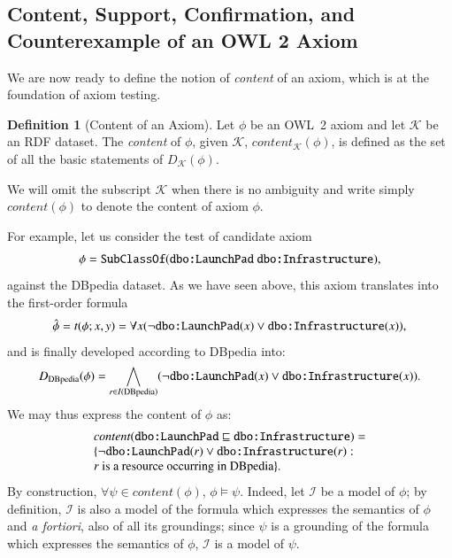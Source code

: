 \documentclass[review]{elsarticle}
\theoremstyle{definition}
\newtheorem{definition}{Definition}
\begin{document}
\subsection{Content, Support, Confirmation, and Counterexample of an OWL 2 Axiom}

We are now ready to define the notion of \emph{content} of an axiom,
which is at the foundation of axiom testing.

\begin{definition}[Content of an Axiom]\label{def:content}
  Let $\phi$ be an OWL~2 axiom and let $\mathcal{K}$ be an RDF dataset.
  The \emph{content} of $\phi$, given $\mathcal{K}$, $content_{\mathcal{K}}(\phi)$,
  is defined as the set of all the basic statements of $D_{\mathcal{K}}(\phi)$.
\end{definition}

We will omit the subscript $\mathcal{K}$ when there is no ambiguity and
write simply $content(\phi)$ to denote the content of axiom $\phi$.

For example, let us consider the test of candidate axiom
\[
  \phi = \mbox{\texttt{SubClassOf}(\texttt{dbo:LaunchPad} \texttt{dbo:Infrastructure})},
\]
against the DBpedia dataset.
As we have seen above, this axiom translates into the first-order formula
\[
  \hat\phi = t(\phi; x, y) = \forall x (\neg\mbox{\texttt{dbo:LaunchPad}}(x) \lor
                        \mbox{\texttt{dbo:Infrastructure}}(x)),
\]
and is finally developed according to DBpedia into:
\[
  D_{\mathrm{DBpedia}}(\phi) = \bigwedge_{r \in I(\mathrm{DBpedia})}
                                (\neg\mbox{\texttt{dbo:LaunchPad}}(x) \lor
                                 \mbox{\texttt{dbo:Infrastructure}}(x)).
\]
We may thus express the content of $\phi$ as:
\[
\begin{array}{lll}
    & content(\texttt{dbo:LaunchPad} \sqsubseteq \texttt{dbo:Infrastructure}) =& \\
	 & \{  \neg\mbox{\tt dbo:LaunchPad}(r) \lor \mbox{\tt dbo:Infrastructure}(r) :\\
       & \mbox{$r$ is a resource occurring in DBpedia} \}.
  \end{array}
\]
By construction,  $\forall \psi \in content(\phi)$, $\phi \models \psi$.
Indeed, let $\mathcal{I}$ be a model of $\phi$;
by definition, $\mathcal{I}$ is also a model of the formula which expresses the semantics of $\phi$
and \emph{a fortiori}, also of all its groundings; since $\psi$ is a grounding of the
formula which expresses the semantics of $\phi$, $\mathcal{I}$ is a model of $\psi$.
\end{document}
